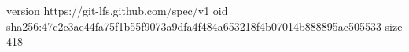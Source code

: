 version https://git-lfs.github.com/spec/v1
oid sha256:47c2c3ae44fa75f1b55f9073a9dfa4f484a653218f4b07014b888895ac505533
size 418
